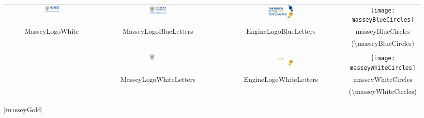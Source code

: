 \documentclass[10pt,aspectratio=169]{beamer}
\begin{document}
\begin{frame}
\color{masseyGold}
\vspace*{-5ex}
\footnotesize
\begin{center}
\begin{tabular}{cccc}
\includegraphics[width=0.2\textwidth]{uniLogo/MasseyLogoWhite}&
\includegraphics[width=0.2\textwidth]{uniLogo/MasseyLogoBlueLetters}&
\includegraphics[width=0.2\textwidth]{uniLogo/EngineLogoBlueLetters}&
\texttt{[image: \\masseyBlueCircles]}\\
MasseyLogoWhite & MasseyLogoBlueLetters& EngineLogoBlueLetters &
masseyBlueCircles \\
&&&(\textbackslash masseyBlueCircles)\\&&&\\
&
\includegraphics[width=0.2\textwidth]{uniLogo/MasseyLogoWhiteLetters}&
\includegraphics[width=0.2\textwidth]{uniLogo/EngineLogoWhiteLetters}&
\texttt{[image: \\masseyWhiteCircles]}\\
& MasseyLogoWhiteLetters& EngineLogoWhiteLetters &
masseyWhiteCircles \\&&&(\textbackslash masseyWhiteCircles)\\
\end{tabular}
\end{center}
\end{frame}


[masseyGold]
\end{document}
